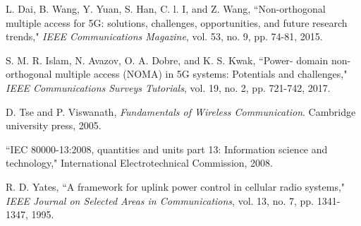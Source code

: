 \documentclass[10pt,journal,final,finalsubmission,twocolumn]{IEEEtran}
\begin{document}
\begin{thebibliography}{99}
 L. Dai, B. Wang, Y. Yuan, S. Han, C. l. I, and Z. Wang, ``Non-orthogonal multiple access for 5G: solutions, challenges, opportunities, and future research trends," {\em IEEE Communications Magazine}, vol. 53, no. 9, pp. 74-81, 2015.

 S. M. R. Islam, N. Avazov, O. A. Dobre, and K. S. Kwak, ``Power- domain non-orthogonal multiple access (NOMA) in 5G systems: Potentials and challenges," {\em IEEE Communications Surveys Tutorials}, vol. 19, no. 2, pp. 721-742, 2017.

 D. Tse and P. Viswanath, {\em Fundamentals of Wireless Communication}. Cambridge university press, 2005.

 ``IEC 80000-13:2008, quantities and units part 13: Information science and technology," International Electrotechnical Commission, 2008.

 R. D. Yates, ``A framework for uplink power control in cellular radio
systems," {\em IEEE Journal on Selected Areas in Communications}, vol. 13,
no. 7, pp. 1341-1347, 1995.



\end{thebibliography}
\end{document}
